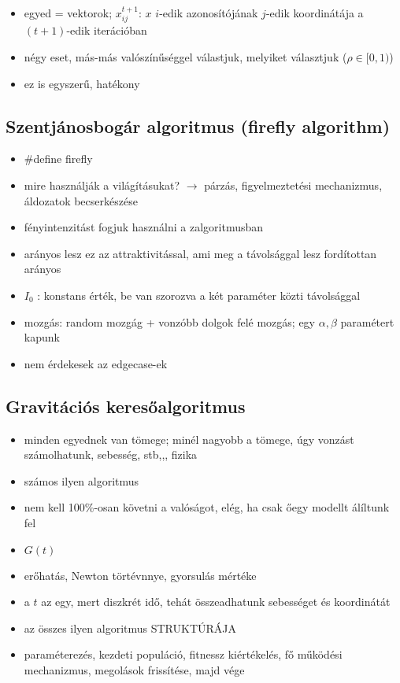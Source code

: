 \documentclass[a4paper, 11pt]{article}
\begin{document}
\begin{itemize}
	\item egyed = vektorok; $x_{ij}^{t+1}$: $x$ $i$-edik azonosítójának $j$-edik koordinátája a $(t+1)$-edik iterációban
	\item négy eset, más-más valószínűséggel válastjuk, melyiket választjuk ($\rho \in [0,1)$)
	\item ez is egyszerű, hatékony
\end{itemize}

\subsection{Szentjánosbogár algoritmus (firefly algorithm)}

\begin{itemize}
	\item \#define firefly
	\item mire használják a világításukat? $\to$ párzás, figyelmeztetési mechanizmus, áldozatok becserkészése
	\item fényintenzitást fogjuk használni a zalgoritmusban
	\item arányos lesz ez az attraktivitással, ami meg a távolsággal lesz fordítottan arányos
	\item $I_0$ : konstans érték, be van szorozva a két paraméter közti távolsággal
	\item mozgás: random mozgág + vonzóbb dolgok felé mozgás; egy $\alpha, \beta$ paramétert kapunk
	\item nem érdekesek az edgecase-ek
\end{itemize}


\subsection{Gravitációs keresőalgoritmus}

\begin{itemize}
	\item minden egyednek van tömege; minél nagyobb a tömege, úgy vonzást számolhatunk, sebesség, stb,,, fizika
	\item számos ilyen algoritmus
	\item nem kell 100\%-osan követni a valóságot, elég, ha csak őegy modellt álíltunk fel
	\item $G(t)$
	\item erőhatás, Newton törtévnnye, gyorsulás mértéke
	\item a $t$ az egy, mert diszkrét idő, tehát összeadhatunk sebességet és koordinátát
	\item az összes ilyen algoritmus STRUKTÚRÁJA
	\item paraméterezés,  kezdeti populáció, fitnessz kiértékelés, fő működési mechanizmus, megolások frissítése, majd vége
\end{itemize}
\end{document}
